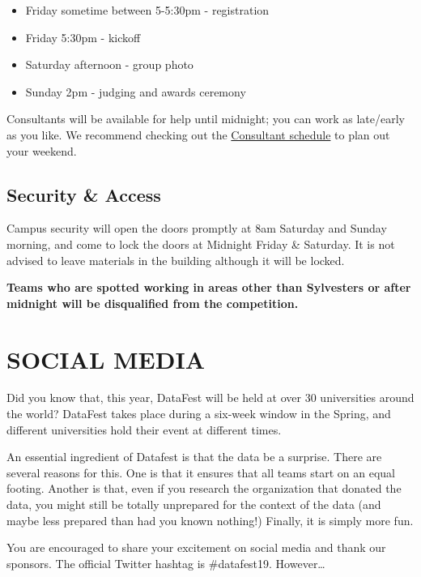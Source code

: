 \documentclass[]{article}
\providecommand{\tightlist}{%
  \setlength{\itemsep}{0pt}\setlength{\parskip}{0pt}}
\begin{document}
\begin{itemize}
\tightlist
\item
  Friday sometime between 5-5:30pm - registration
\item
  Friday 5:30pm - kickoff
\item
  Saturday afternoon - group photo
\item
  Sunday 2pm - judging and awards ceremony
\end{itemize}

Consultants will be available for help until midnight; you can work as
late/early as you like. We recommend checking out the
\href{INSERT\%20LINK}{Consultant schedule} to plan out your weekend.

\hypertarget{security-access}{%
\subsection{Security \& Access}\label{security-access}}

Campus security will open the doors promptly at 8am Saturday and Sunday
morning, and come to lock the doors at Midnight Friday \& Saturday. It
is not advised to leave materials in the building although it will be
locked.

\textbf{Teams who are spotted working in areas other than Sylvesters or
after midnight will be disqualified from the competition.}

\hypertarget{social-media}{%
\section{SOCIAL MEDIA}\label{social-media}}

Did you know that, this year, DataFest will be held at over 30
universities around the world? DataFest takes place during a six-week
window in the Spring, and different universities hold their event at
different times.

An essential ingredient of Datafest is that the data be a surprise.
There are several reasons for this. One is that it ensures that all
teams start on an equal footing. Another is that, even if you research
the organization that donated the data, you might still be totally
unprepared for the context of the data (and maybe less prepared than had
you known nothing!) Finally, it is simply more fun.

You are encouraged to share your excitement on social media and thank
our sponsors. The official Twitter hashtag is \#datafest19.
However\ldots{}
\end{document}
